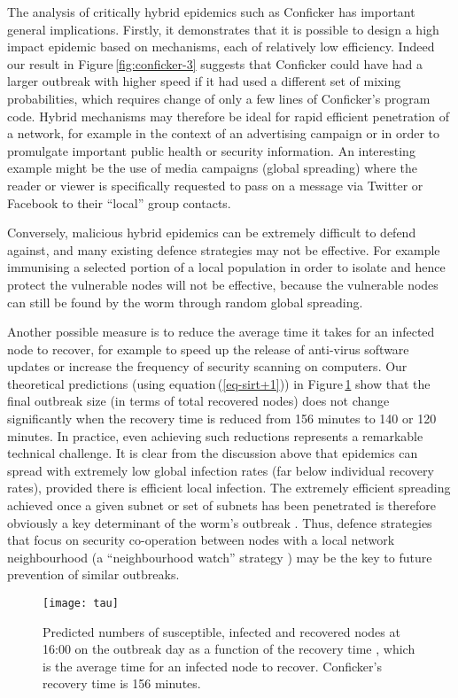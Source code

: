 \documentclass[9pt]{article}
\newcommand{\reffig}[1]{Figure\,\ref{#1}}
\newcommand{\refeq}[1]{equation\,(\ref{#1})}
\begin{document}
{The analysis of critically hybrid epidemics such as Conficker has important general implications. Firstly, it demonstrates that it is possible to design a high impact epidemic based on mechanisms, each of relatively low efficiency. Indeed our result in \reffig{fig:conficker-3} suggests that Conficker could have had a larger outbreak with higher speed if it had used a different set of mixing probabilities, which  requires change of only a few lines of Conficker's program code. Hybrid mechanisms may therefore be ideal for rapid efficient penetration of a network, for example in the context of an advertising campaign or in order to promulgate important public health or security information. An interesting example might be the use of media campaigns (global spreading) where the reader or viewer is specifically requested to pass on a message via Twitter or Facebook to their ``local'' group contacts. 

Conversely, malicious hybrid epidemics can be extremely difficult to defend against, and many existing defence strategies may not be effective. For example immunising a selected portion of a local population in order to isolate and hence protect the vulnerable nodes will not be effective, because the vulnerable nodes can still be found by the worm through random global spreading. 

Another possible measure is to reduce the average time it takes for an infected node to recover, for example to speed up the release of anti-virus software updates or increase the frequency of security scanning on computers.
Our theoretical predictions (using \refeq{eq-sirt+1}) in \reffig{fig-tau} show that the final outbreak size (in terms of total recovered nodes) does not change significantly when the recovery time is reduced from 156 minutes to 140 or 120 minutes. In practice, even achieving such reductions  represents a remarkable technical challenge. It is clear from the discussion above that epidemics can spread with extremely low global infection rates (far below individual recovery rates), provided there is efficient local infection. The extremely efficient spreading achieved once a given subnet or set of subnets has been penetrated is therefore obviously a key determinant of the worm's outbreak \cite{Shin_2012}. Thus, defence strategies that focus on security co-operation between nodes with a local network neighbourhood (a ``neighbourhood watch'' strategy \cite{Shin_2012}) may be the key to future prevention of similar outbreaks.

\begin{figure}[h]
\centering\small
\texttt{[image: tau]}
\caption{\label{fig-tau}Predicted numbers of susceptible, infected and recovered nodes at 16:00 on the outbreak day as a function of the recovery time , which is the average time for an infected node to recover. Conficker's recovery time is 156 minutes.}
\end{figure}

}
\end{document}

